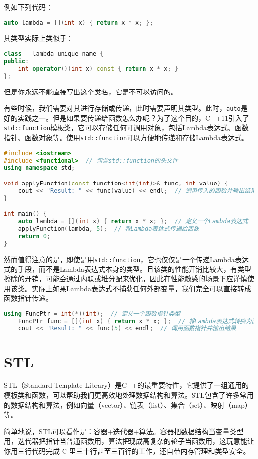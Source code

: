 \documentclass[../main.tex]{subfiles}
\begin{document}
例如下列代码：
\begin{lstlisting}[language=C++]
auto lambda = [](int x) { return x * x; };  
\end{lstlisting}
其类型实际上类似于：
\begin{lstlisting}[language=C++]
class __lambda_unique_name {
public:
    int operator()(int x) const { return x * x; }
};
\end{lstlisting}
但是你永远不能直接写出这个类名，它是不可以访问的。

有些时候，我们需要对其进行存储或传递，此时需要声明其类型。此时，\texttt{auto}是好的实践之一。但是如果要传递给函数怎么办呢？为了这个目的，C++11引入了\texttt{std::function}模板类，它可以存储任何可调用对象，包括Lambda表达式、函数指针、函数对象等。使用\texttt{std::function}可以方便地传递和存储Lambda表达式。
\begin{lstlisting}[language=C++]
#include <iostream>
#include <functional>  // 包含std::function的头文件
using namespace std;

void applyFunction(const function<int(int)>& func, int value) {
    cout << "Result: " << func(value) << endl;  // 调用传入的函数并输出结果
}

int main() {
    auto lambda = [](int x) { return x * x; };  // 定义一个Lambda表达式
    applyFunction(lambda, 5);  // 将Lambda表达式传递给函数
    return 0;
}
\end{lstlisting}
然而值得注意的是，即使是用\texttt{std::function}，它也仅仅是一个传递Lambda表达式的手段，而不是Lambda表达式本身的类型。且该类的性能开销比较大，有类型擦除的开销，可能会通过内联或堆分配来优化，因此在性能敏感的场景下应谨慎使用该类。实际上如果Lambda表达式不捕获任何外部变量，我们完全可以直接转成函数指针传递。
\begin{lstlisting}[language=C++]
    using FuncPtr = int(*)(int);  // 定义一个函数指针类型
    FuncPtr func = [](int x) { return x * x; };  // 将Lambda表达式转换为函数指针
    cout << "Result: " << func(5) << endl;  // 调用函数指针并输出结果
\end{lstlisting}

\section{STL}

STL（Standard Template Library）是C++的最重要特性，它提供了一组通用的模板类和函数，可以帮助我们更高效地处理数据结构和算法。STL包含了许多常用的数据结构和算法，例如向量（vector）、链表（list）、集合（set）、映射（map）等。

简单地说，STL可以看作是：容器+迭代器+算法。容器把数据结构当变量类型用，迭代器把指针当普通函数用，算法把现成高复杂的轮子当函数用，这玩意能让你用三行代码完成 C 里三十行甚至三百行的工作，还自带内存管理和类型安全。
\end{document}
